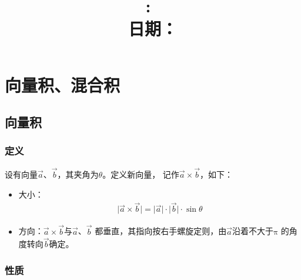 \documentclass[12pt, a4paper]{article}
\title{
    \vspace{2in}
    \textmd{\textbf{\hmwkClass:\ \hmwkTitle}}\\
    \normalsize\vspace{0.1in}\small{日期： \hmwkDueDate}\\
    \vspace{0.1in}\large{\textit{\myUniversiy}}
    \vspace{3in}
}
\author{\hmwkAuthorName}
\date{}
\numberwithin{equation}{section}
\begin{document}
\maketitle

\pagebreak


\tableofcontents

\pagebreak


\pagebreak

\section{向量积、混合积}

\subsection{向量积}

\subsubsection{定义}

    设有向量\(\overrightarrow{a}\)、\(\overrightarrow{b}\)，其夹角为\(\theta\)。定义新向量，
    记作\(\overrightarrow{a} \times \overrightarrow{b}\)，如下：

    \begin{itemize}
        \item 大小：
            \begin{align}
                \lvert \overrightarrow{a} \times \overrightarrow{b} \rvert =
                \lvert \overrightarrow{a} \rvert \cdot \lvert \overrightarrow{b} \rvert \cdot \sin\theta
            \end{align}            
        \item 方向：\(\overrightarrow{a} \times \overrightarrow{b}\)与\(\overrightarrow{a}\)、\(\overrightarrow{b}\)
            都垂直，其指向按右手螺旋定则，由\(\overrightarrow{a}\)沿着不大于\(\mathrm{\pi}\)
            的角度转向\(\overrightarrow{b}\)确定。
    \end{itemize}

\subsubsection{性质}
\end{document}
